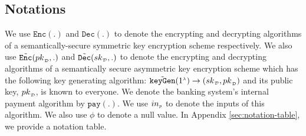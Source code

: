 \vspace{-3mm}

\subsection{Notations}
We use $\mathtt{Enc}(.)$  and $\mathtt{Dec}(.)$ to denote the encrypting and decrypting algorithms of   a semantically-secure symmetric key encryption scheme respectively. We also use  ${ \tilde {\mathtt{Enc}}}({pk}_{\scriptscriptstyle\mathcal {D}}, .)$ and   ${\tilde{\mathtt {Dec}}}({sk}_{\scriptscriptstyle\mathcal {D}}, .)$ to denote the encrypting and decrypting algorithms of   a semantically secure asymmetric key encryption scheme  which has  the following key generating algorithm:  $\tilde{\mathtt{keyGen}}(1^{\scriptscriptstyle\lambda})\rightarrow({sk}_{\scriptscriptstyle\mathcal {D}}, {pk}_{\scriptscriptstyle\mathcal {D}})$ and its  public key, ${pk}_{\scriptscriptstyle\mathcal {D}}$, is known to everyone.  We denote the banking system's internal payment  algorithm by  $\mathtt{pay}(.)$.  We use $in_{\scriptscriptstyle p}$ to denote the inputs of this algorithm.  We also use $\phi$ to denote a null value. In Appendix \ref{sec:notation-table}, we provide a notation table. 







